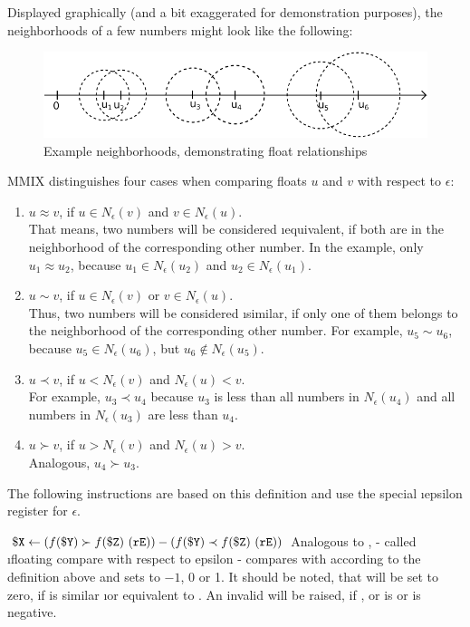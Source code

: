 Displayed graphically (and a bit exaggerated for demonstration purposes), the neighborhoods of a few numbers might look like the following:
\begin{figure}[H]
	\centering
	\includegraphics[width=\textwidth]{img/cmpe-less-crop.pdf}
	\caption{Example neighborhoods, demonstrating float relationships}
\end{figure}
\noindent MMIX distinguishes four cases when comparing floats $u$ and $v$ with respect to $\epsilon$:
\begin{enumerate}
	\item $u \approx v$, if $u \in N_\epsilon(v)$ and $v \in N_\epsilon(u)$.\\
	That means, two numbers will be considered \i{equivalent}, if both are in the neighborhood of the corresponding other number. In the example, only $u_1 \approx u_2$, because $u_1 \in N_\epsilon(u_2)$ and $u_2 \in N_\epsilon(u_1)$.
	\item $u \sim v$, if $u \in N_\epsilon(v)$ or $v \in N_\epsilon(u)$.\\
	Thus, two numbers will be considered \i{similar}, if only one of them belongs to the neighborhood of the corresponding other number. For example, $u_5 \sim u_6$, because $u_5 \in N_\epsilon(u_6)$, but $u_6 \notin N_\epsilon(u_5)$.
	\item $u \prec v$, if $u < N_\epsilon(v)$ and $N_\epsilon(u) < v$.\\
	For example, $u_3 \prec u_4$ because $u_3$ is less than all numbers in $N_\epsilon(u_4)$ and all numbers in $N_\epsilon(u_3)$ are less than $u_4$.
	\item $u \succ v$, if $u > N_\epsilon(v)$ and $N_\epsilon(u) > v$.\\
	Analogous, $u_4 \succ u_3$.
\end{enumerate}
\citep[pg. 19]{mmix-doc} The following instructions are based on this definition and use the special \i{epsilon register}  for $\epsilon$.

\instrtbl
	{}
	{${\tt \$X} \leftarrow (f({\tt \$Y}) \succ f({\tt \$Z})~({\tt rE})) - (f({\tt \$Y}) \prec f({\tt \$Z})~({\tt rE}))$}
\noindent Analogous to ,  - called \i{floating compare with respect to epsilon} - compares  with  according to the definition above and sets  to $-1$, 0 or 1. It should be noted, that  will be set to zero, if  is similar \i{or} equivalent to . An invalid  will be raised, if ,  or  is \NaN or  is negative. \citep[pg. 19]{mmix-doc}

